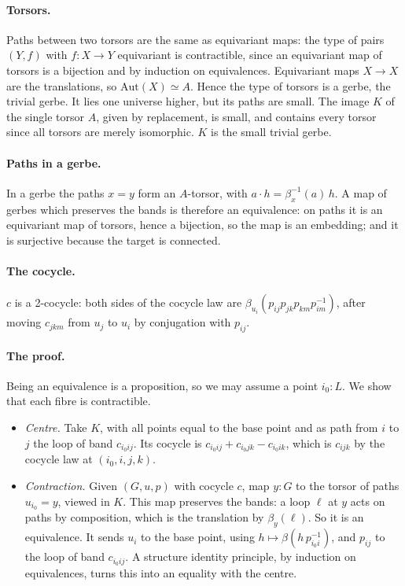 \documentclass[11pt]{article}
\theoremstyle{remark}
\begin{document}
\paragraph{Torsors.} Paths between two torsors are the same as
equivariant maps: the type of pairs $(Y,f)$ with $f:X\to Y$ equivariant
is contractible, since an equivariant map of torsors is a bijection and
by induction on equivalences. Equivariant maps $X\to X$ are the
translations, so $\mathrm{Aut}(X)\simeq A$. Hence the type of torsors is
a gerbe, the trivial gerbe. It lies one universe higher, but its paths
are small. The image $K$ of the single torsor $A$, given by replacement,
is small, and contains every torsor since all torsors are merely
isomorphic. $K$ is the small trivial gerbe.

\paragraph{Paths in a gerbe.} In a gerbe the paths $x=y$ form an
$A$-torsor, with $a\cdot h=\beta_x^{-1}(a)\,h$. A map of gerbes which
preserves the bands is therefore an equivalence: on paths it is an
equivariant map of torsors, hence a bijection, so the map is an
embedding; and it is surjective because the target is connected.

\paragraph{The cocycle.} $c$ is a 2-cocycle: both sides of the cocycle
law are $\beta_{u_i}(p_{ij}p_{jk}p_{km}p_{im}^{-1})$, after moving
$c_{jkm}$ from $u_j$ to $u_i$ by conjugation with $p_{ij}$.

\paragraph{The proof.} Being an equivalence is a proposition, so we may
assume a point $i_0:L$. We show that each fibre is contractible.
\begin{itemize}
\item \emph{Centre.} Take $K$, with all points equal to the base point
  and as path from $i$ to $j$ the loop of band $c_{i_0ij}$. Its cocycle is
  $c_{i_0ij}+c_{i_0jk}-c_{i_0ik}$, which is $c_{ijk}$ by the cocycle law at
  $(i_0,i,j,k)$.
\item \emph{Contraction.} Given $(G,u,p)$ with cocycle $c$, map $y:G$ to
  the torsor of paths $u_{i_0}=y$, viewed in $K$. This map preserves the
  bands: a loop $\ell$ at $y$ acts on paths by composition, which is the
  translation by $\beta_y(\ell)$. So it is an equivalence. It sends $u_i$
  to the base point, using $h\mapsto\beta(h\,p_{i_0i}^{-1})$, and $p_{ij}$
  to the loop of band $c_{i_0ij}$. A structure identity principle, by
  induction on equivalences, turns this into an equality with the centre.
\end{itemize}
\end{document}
